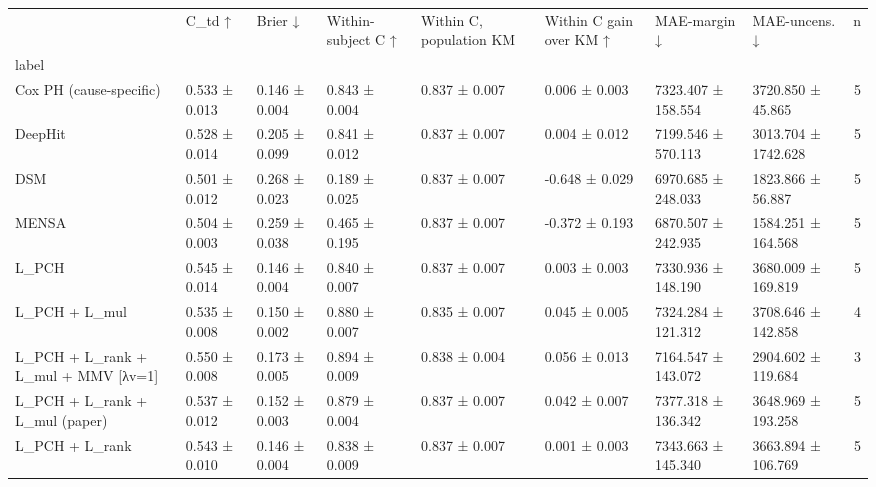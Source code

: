 \begin{tabular}{llllllllr}
\toprule
 & C\_td ↑ & Brier ↓ & Within-subject C ↑ & Within C, population KM & Within C gain over KM ↑ & MAE-margin ↓ & MAE-uncens. ↓ & n \\
label &  &  &  &  &  &  &  &  \\
\midrule
Cox PH (cause-specific) & 0.533 ± 0.013 & 0.146 ± 0.004 & 0.843 ± 0.004 & 0.837 ± 0.007 & 0.006 ± 0.003 & 7323.407 ± 158.554 & 3720.850 ± 45.865 & 5 \\
DeepHit & 0.528 ± 0.014 & 0.205 ± 0.099 & 0.841 ± 0.012 & 0.837 ± 0.007 & 0.004 ± 0.012 & 7199.546 ± 570.113 & 3013.704 ± 1742.628 & 5 \\
DSM & 0.501 ± 0.012 & 0.268 ± 0.023 & 0.189 ± 0.025 & 0.837 ± 0.007 & -0.648 ± 0.029 & 6970.685 ± 248.033 & 1823.866 ± 56.887 & 5 \\
MENSA & 0.504 ± 0.003 & 0.259 ± 0.038 & 0.465 ± 0.195 & 0.837 ± 0.007 & -0.372 ± 0.193 & 6870.507 ± 242.935 & 1584.251 ± 164.568 & 5 \\
L\_PCH & 0.545 ± 0.014 & 0.146 ± 0.004 & 0.840 ± 0.007 & 0.837 ± 0.007 & 0.003 ± 0.003 & 7330.936 ± 148.190 & 3680.009 ± 169.819 & 5 \\
L\_PCH + L\_mul & 0.535 ± 0.008 & 0.150 ± 0.002 & 0.880 ± 0.007 & 0.835 ± 0.007 & 0.045 ± 0.005 & 7324.284 ± 121.312 & 3708.646 ± 142.858 & 4 \\
L\_PCH + L\_rank + L\_mul + MMV [λv=1] & 0.550 ± 0.008 & 0.173 ± 0.005 & 0.894 ± 0.009 & 0.838 ± 0.004 & 0.056 ± 0.013 & 7164.547 ± 143.072 & 2904.602 ± 119.684 & 3 \\
L\_PCH + L\_rank + L\_mul (paper) & 0.537 ± 0.012 & 0.152 ± 0.003 & 0.879 ± 0.004 & 0.837 ± 0.007 & 0.042 ± 0.007 & 7377.318 ± 136.342 & 3648.969 ± 193.258 & 5 \\
L\_PCH + L\_rank & 0.543 ± 0.010 & 0.146 ± 0.004 & 0.838 ± 0.009 & 0.837 ± 0.007 & 0.001 ± 0.003 & 7343.663 ± 145.340 & 3663.894 ± 106.769 & 5 \\
\bottomrule
\end{tabular}
